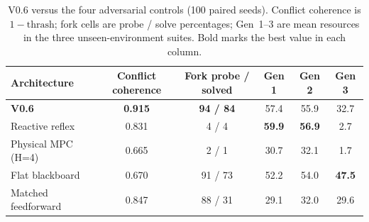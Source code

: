 \documentclass[11pt,a4paper]{article}
\begin{document}
\begin{table}[t]
\centering
\small
\caption{V0.6 versus the four adversarial controls (100 paired seeds). Conflict coherence is $1-\text{thrash}$; fork cells are probe / solve percentages; Gen~1--3 are mean resources in the three unseen-environment suites. Bold marks the best value in each column.}
\label{tab:controls}
\begin{tabular}{lccccc}
\toprule
Architecture & Conflict coherence & Fork probe / solved & Gen 1 & Gen 2 & Gen 3 \\
\midrule
\textbf{V0.6} & \textbf{0.915} & \textbf{94 / 84} & 57.4 & 55.9 & 32.7 \\
Reactive reflex & 0.831 & 4 / 4 & \textbf{59.9} & \textbf{56.9} & 2.7 \\
Physical MPC (H=4) & 0.665 & 2 / 1 & 30.7 & 32.1 & 1.7 \\
Flat blackboard & 0.670 & 91 / 73 & 52.2 & 54.0 & \textbf{47.5} \\
Matched feedforward & 0.847 & 88 / 31 & 29.1 & 32.0 & 29.6 \\
\bottomrule
\end{tabular}
\end{table}

\begin{table}[t]
\centering
\small
\caption{Full $6\times5$ crossed ablation matrix at 100 paired seeds. Cells are Cohen's $d_z$ for the primary contrast (Exp~1 absorption, Exp~2 coherence, Exp~4 fork solved, Exp~5 detection latency) and four-way attribution macro-F1 for Exp~3; $^{*}$ marks Holm-adjusted $p<0.05$. Positive values mean the intact architecture is higher on that metric; negative values mean the ablation is higher.}
\label{tab:crossed}
\end{table}
\end{document}
